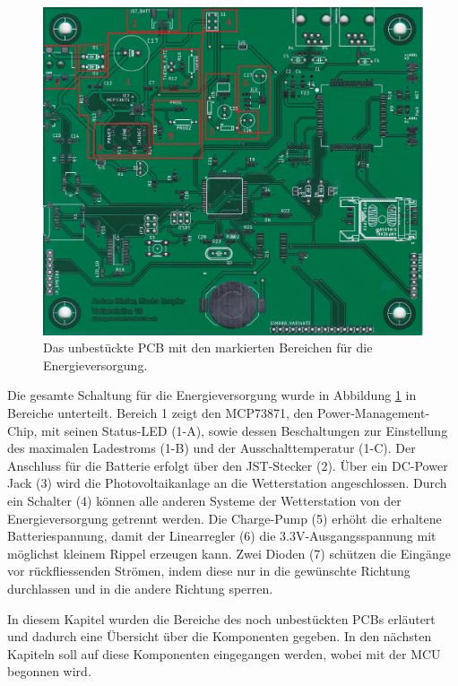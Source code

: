 \begin{figure}[h]
\centering
\includegraphics[width=0.99\linewidth]{graphics/HW_Uebersicht/PCB_Energieversorgung.jpg}
\caption{Das unbestückte PCB mit den markierten Bereichen für die Energieversorgung.}
\label{fig:Uebersicht_PCB_Energie}
\end{figure}
Die gesamte Schaltung für die Energieversorgung wurde in Abbildung \ref{fig:Uebersicht_PCB_Energie} in Bereiche unterteilt. Bereich 1 zeigt den MCP73871, den Power-Management-Chip, mit seinen Status-LED (1-A), sowie dessen Beschaltungen zur Einstellung des maximalen Ladestroms (1-B) und der Ausschalttemperatur (1-C). Der Anschluss für die Batterie erfolgt über den JST-Stecker (2). Über ein DC-Power Jack (3) wird die Photovoltaikanlage an die Wetterstation angeschlossen. Durch ein Schalter (4) können alle anderen Systeme der Wetterstation von der Energieversorgung getrennt werden. Die Charge-Pump (5) erhöht die erhaltene Batteriespannung, damit der Linearregler (6) die 3.3V-Ausgangsspannung mit möglichst kleinem Rippel erzeugen kann. Zwei Dioden (7) schützen die Eingänge vor rückfliessenden Strömen, indem diese nur in die gewünschte Richtung durchlassen und in die andere Richtung sperren.

In diesem Kapitel wurden die Bereiche des noch unbestückten PCBs erläutert und dadurch eine Übersicht über die Komponenten gegeben. In den nächsten Kapiteln soll auf diese Komponenten eingegangen werden, wobei mit der MCU begonnen wird.\\